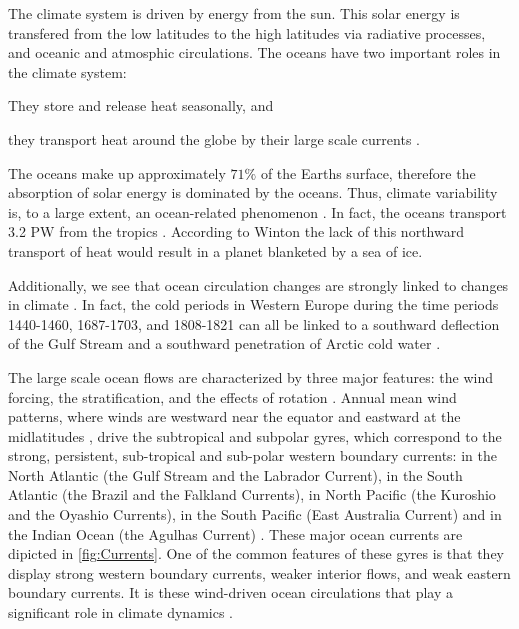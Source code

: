 The climate system is driven by energy from the sun. This solar energy is
transfered from the low latitudes to the high latitudes via radiative processes,
and oceanic and atmosphic circulations. The oceans have two important roles in
the climate system: \begin{inparaenum}[1)]\item They store and release heat
seasonally, and \item they transport heat around the globe by their large scale
currents \cite{Winton2003}.\end{inparaenum} The oceans make up approximately
$71\%$ of the Earths surface, therefore the absorption of solar energy is
dominated by the oceans.  Thus, climate variability is, to a large extent, an
ocean-related phenomenon \cite{Siedler01}. In fact, the oceans transport 3.2
PW from the tropics \cite{Trenberth2001}. According to Winton
\cite{Winton2003} the lack of this northward transport of heat would result in
a planet blanketed by a sea of ice.

Additionally, we see that ocean circulation changes are strongly linked to
changes in climate \cite{Morner95, Siedler01}. In fact, the cold periods in
Western Europe during the time periods 1440-1460, 1687-1703, and 1808-1821 can
all be linked to a southward deflection of the Gulf Stream and a southward
penetration of Arctic cold water \cite{Morner95}.

The large scale ocean flows are characterized by three major features: the wind
forcing, the stratification, and the effects of rotation \cite{Majda, Vallis06}.
Annual mean wind patterns, where winds are westward near the equator and
eastward at the midlatitudes \cite{Dijkstra08}, drive the subtropical and
subpolar gyres, which correspond to the strong, persistent, sub-tropical and
sub-polar western boundary currents: in the North Atlantic (the Gulf Stream and
the Labrador Current), in the South Atlantic (the Brazil and the Falkland
Currents), in North Pacific (the Kuroshio and the Oyashio Currents), in the
South Pacific (East Australia Current) and in the Indian Ocean (the Agulhas
Current) \cite{Dijkstra08,Vallis06}. These major ocean currents are dipicted in
\autoref{fig:Currents}. One of the common features of these gyres is that they
display strong western boundary currents, weaker interior flows, and weak
eastern boundary currents. It is these wind-driven ocean circulations that play a
significant role in climate dynamics \cite{Beesley2008,Dijkstra05,Ekman1905,Ghil08}.

